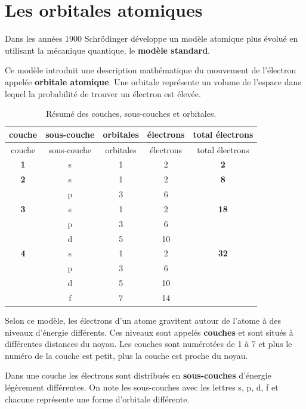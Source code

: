 \documentclass[
  11pt,
  a4paper,
  openany]{book}
\begin{document}
\section{Les orbitales atomiques}\label{les-orbitales-atomiques}

Dans les années 1900 Schrödinger développe un modèle atomique plus évolué en utilisant la mécanique quantique, le \textbf{modèle standard}.

Ce modèle introduit une description mathématique du mouvement de l'électron appelée \textbf{orbitale atomique}. Une orbitale représente un volume de l'espace dans lequel la probabilité de trouver un électron est élevée.

\clearpage

\begin{longtable}[]{@{}ccccc@{}}
\caption{\label{tab:couches-sous-couches-orbitales} Résumé des couches, sous-couches et orbitales.}\tabularnewline
\toprule\noalign{}
couche & sous-couche & orbitales & électrons & total électrons \\
\midrule\noalign{}
\endfirsthead
\toprule\noalign{}
couche & sous-couche & orbitales & électrons & total électrons \\
\midrule\noalign{}
\endhead
\bottomrule\noalign{}
\endlastfoot
\textbf{1} & s & 1 & 2 & \textbf{2} \\
\textbf{2} & s & 1 & 2 & \textbf{8} \\
& p & 3 & 6 & \\
\textbf{3} & s & 1 & 2 & \textbf{18} \\
& p & 3 & 6 & \\
& d & 5 & 10 & \\
\textbf{4} & s & 1 & 2 & \textbf{32} \\
& p & 3 & 6 & \\
& d & 5 & 10 & \\
& f & 7 & 14 & \\
\end{longtable}

Selon ce modèle, les électrons d'un atome gravitent autour de l'atome à des niveaux d'énergie différents. Ces niveaux sont appelés \textbf{couches} et sont situés à différentes distances du noyau. Les couches sont numérotées de 1 à 7 et plus le numéro de la couche est petit, plus la couche est proche du noyau.

Dans une couche les électrons sont distribués en \textbf{sous-couches} d'énergie légèrement différentes. On note les sous-couches avec les lettres s, p, d, f et chacune représente une forme d'orbitale différente.
\end{document}
